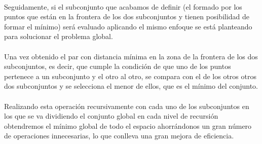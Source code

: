 \documentclass{article}
\begin{document}
			\paragraph{}
			Seguidamente, si el subconjunto que acabamos de  definir (el formado por los puntos que están en la frontera de los dos subconjuntos y tienen posibilidad de formar el mínimo) será evaluado aplicando el mismo enfoque se está planteando para solucionar el problema global.

			\paragraph{}
			Una vez obtenido el par con distancia mínima en la zona de la frontera de los dos subconjuntos, es decir, que cumple la condición de que uno de los puntos pertenece a un subconjunto y el otro al otro, se compara con el de los otros otros dos subconjuntos y se selecciona el menor de ellos, que es el mínimo del conjunto.

	\paragraph{}
	Realizando esta operación recursivamente con cada uno de los subconjuntos en los que se va dividiendo el conjunto global en cada nivel de recursión obtendremos el mínimo global de todo el espacio ahorrándonos un gran número de operaciones innecesarias, lo que conlleva una gran mejora de eficiencia.	
	
\end{document}
